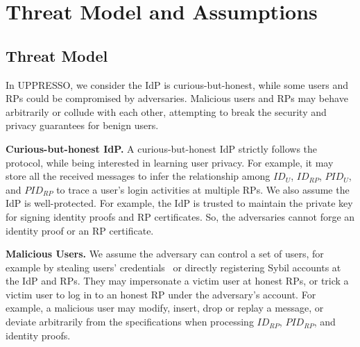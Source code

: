 \section{Threat Model and Assumptions}
\label{sec:assumptionandthreatmodel}


\subsection{Threat Model}
In UPPRESSO, we consider the IdP is curious-but-honest, while some users and RPs could be compromised by adversaries. %
Malicious users and RPs may behave arbitrarily or collude with each other, attempting to break the security and privacy guarantees for benign users.

\vspace{0.5mm}
\noindent \textbf{Curious-but-honest IdP.}
A curious-but-honest IdP strictly follows the protocol, while being interested in learning user privacy.  %
For example, it may store all the received messages to infer the relationship among $ID_U$, $ID_{RP}$, $PID_{U}$, and $PID_{RP}$ to trace a user's login activities at multiple RPs. We also assume the IdP is well-protected. %
For example, the IdP is trusted to maintain the private key for signing identity proofs and RP certificates. %
So, the adversaries cannot forge an identity proof or an RP certificate.



\vspace{0.5mm}
\noindent \textbf{Malicious Users.}
We assume the adversary can control a set of users, for example by stealing users' credentials~\cite{WangZWYH16, SunCL12} or directly registering Sybil accounts at the IdP and RPs.
They may impersonate a victim user at honest RPs, or trick a victim user to log in to an honest RP under the adversary's account.
For example, a malicious user may %
modify, insert, drop or replay a message, or deviate arbitrarily from the specifications when processing $ID_{RP}$, $PID_{RP}$, and identity proofs.

